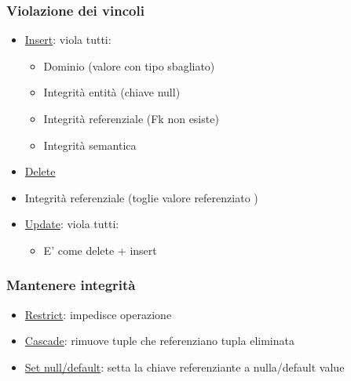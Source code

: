 \subsubsection*{Violazione dei vincoli}
\begin{itemize}
	\item \underline{Insert}: viola tutti:
	      \begin{itemize}
		      \item Dominio (valore con tipo sbagliato)
		      \item Integrità entità (chiave null)
		      \item Integrità referenziale (Fk non esiste)
		      \item Integrità semantica
	      \end{itemize}
	\item \underline{Delete}
	\item Integrità referenziale (toglie valore referenziato )
	\item \underline{Update}: viola tutti:
	      \begin{itemize}
		      \item E' come delete + insert
	      \end{itemize}
\end{itemize}
\subsubsection*{Mantenere integrità}
\begin{itemize}
	\item \underline{Restrict}: impedisce operazione
	\item \underline{Cascade}: rimuove tuple che referenziano tupla eliminata
	\item \underline{Set null/default}: setta la chiave referenziante a nulla/default value
\end{itemize}
